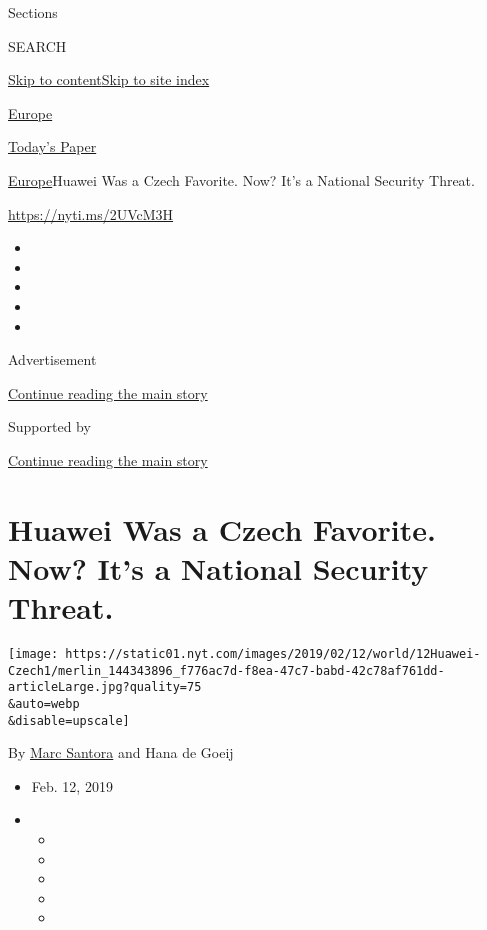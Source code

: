 Sections

SEARCH

\protect\hyperlink{site-content}{Skip to
content}\protect\hyperlink{site-index}{Skip to site index}

\href{https://www.nytimes.com/section/world/europe}{Europe}

\href{https://myaccount.nytimes.com/auth/login?response_type=cookie\&client_id=vi}{}

\href{https://www.nytimes.com/section/todayspaper}{Today's Paper}

\href{/section/world/europe}{Europe}\textbar{}Huawei Was a Czech
Favorite. Now? It's a National Security Threat.

\url{https://nyti.ms/2UVcM3H}

\begin{itemize}
\item
\item
\item
\item
\item
\end{itemize}

Advertisement

\protect\hyperlink{after-top}{Continue reading the main story}

Supported by

\protect\hyperlink{after-sponsor}{Continue reading the main story}

\hypertarget{huawei-was-a-czech-favorite-now-its-a-national-security-threat}{%
\section{Huawei Was a Czech Favorite. Now? It's a National Security
Threat.}\label{huawei-was-a-czech-favorite-now-its-a-national-security-threat}}

\texttt{[image: https://static01.nyt.com/images/2019/02/12/world/12Huawei-Czech1/merlin\_144343896\_f776ac7d-f8ea-47c7-babd-42c78af761dd-articleLarge.jpg?quality=75\\\&auto=webp\\\&disable=upscale]}

By \href{https://www.nytimes.com/by/marc-santora}{Marc Santora} and Hana
de Goeij

\begin{itemize}
\item
  Feb. 12, 2019
\item
  \begin{itemize}
  \item
  \item
  \item
  \item
  \item
  \end{itemize}
\end{itemize}

